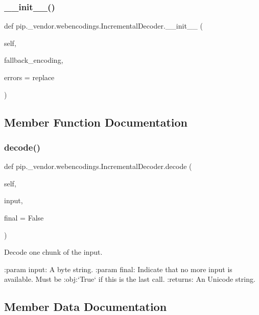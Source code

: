 \subsubsection{\texorpdfstring{\+\_\+\+\_\+init\+\_\+\+\_\+()}{\_\_init\_\_()}}
{\footnotesize\ttfamily def pip.\+\_\+vendor.\+webencodings.\+Incremental\+Decoder.\+\_\+\+\_\+init\+\_\+\+\_\+ (\begin{DoxyParamCaption}\item[{}]{self,  }\item[{}]{fallback\+\_\+encoding,  }\item[{}]{errors = {\ttfamily \textquotesingle{}replace\textquotesingle{}} }\end{DoxyParamCaption})}



\subsection{Member Function Documentation}
\mbox{\label{classpip_1_1__vendor_1_1webencodings_1_1IncrementalDecoder_a289670326c90e6a11d420fb6ad9dcb62}} 
\subsubsection{\texorpdfstring{decode()}{decode()}}
{\footnotesize\ttfamily def pip.\+\_\+vendor.\+webencodings.\+Incremental\+Decoder.\+decode (\begin{DoxyParamCaption}\item[{}]{self,  }\item[{}]{input,  }\item[{}]{final = {\ttfamily False} }\end{DoxyParamCaption})}

\begin{DoxyVerb}Decode one chunk of the input.

:param input: A byte string.
:param final:
    Indicate that no more input is available.
    Must be :obj:`True` if this is the last call.
:returns: An Unicode string.\end{DoxyVerb}
 

\subsection{Member Data Documentation}
\mbox{\label{classpip_1_1__vendor_1_1webencodings_1_1IncrementalDecoder_a7251fe0361b0320f6579f7b8635609ee}} 

